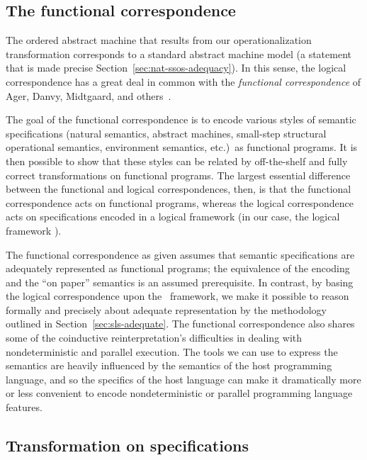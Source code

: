 \subsection*{The functional correspondence}

The ordered abstract machine that results from our operationalization
transformation corresponds to a standard abstract machine model (a
statement that is made precise
Section~\ref{sec:nat-ssos-adequacy}). In this sense, the logical
correspondence has a great deal in common with the {\it functional
  correspondence} of Ager, Danvy, Midtgaard, and
others~\cite{ager03functional,ager04functional,ager05functional,
  danvy08defunctionalized,danvy12interderiving}. 

The goal of the functional correspondence is to encode various styles
of semantic specifications (natural semantics, abstract machines,
small-step structural operational semantics, environment semantics,
etc.)~as functional programs. It is then possible to show that these
styles can be related by off-the-shelf and fully correct
transformations on functional programs. The largest essential
difference between the functional and logical correspondences, then,
is that the functional correspondence acts on functional programs,
whereas the logical correspondence acts on specifications encoded in a
logical framework (in our case, the logical framework \sls).

The functional correspondence as given assumes that semantic
specifications are adequately represented as functional programs; the
equivalence of the encoding and the ``on paper'' semantics is an
assumed prerequisite. In contrast, by basing the logical
correspondence upon the \sls~framework, we make it possible to reason
formally and precisely about adequate representation by the
methodology outlined in Section~\ref{sec:sls-adequate}. The functional
correspondence also shares some of the coinductive reinterpretation's
difficulties in dealing with nondeterministic and parallel execution.
The tools we can use to express the semantics are heavily
influenced by the semantics of the host programming language, and so
the specifics of the host language can make it dramatically more or
less convenient to encode nondeterministic or parallel programming
language features.

\subsection*{Transformation on specifications}


